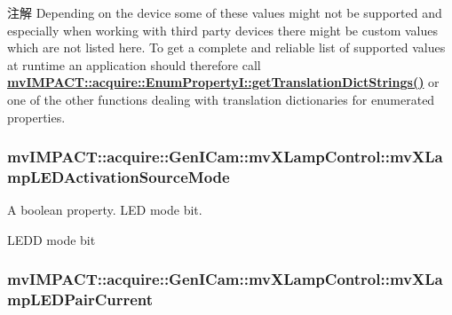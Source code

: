\begin{DoxyNote}{注解}
Depending on the device some of these values might not be supported and especially when working with third party devices there might be custom values which are not listed here. To get a complete and reliable list of supported values at runtime an application should therefore call {\bfseries \hyperlink{classmv_i_m_p_a_c_t_1_1acquire_1_1_enum_property_i_a0ba6ccbf5ee69784d5d0b537924d26b6}{mv\+I\+M\+P\+A\+C\+T\+::acquire\+::\+Enum\+Property\+I\+::get\+Translation\+Dict\+Strings()}} or one of the other functions dealing with translation dictionaries for enumerated properties. 
\end{DoxyNote}
\hypertarget{classmv_i_m_p_a_c_t_1_1acquire_1_1_gen_i_cam_1_1mv_x_lamp_control_adb271d278c08f414bcbf20ea53f72575}{
\subsubsection[{mv\+X\+Lamp\+L\+E\+D\+Activation\+Source\+Mode}]{ mv\+I\+M\+P\+A\+C\+T\+::acquire\+::\+Gen\+I\+Cam\+::mv\+X\+Lamp\+Control\+::mv\+X\+Lamp\+L\+E\+D\+Activation\+Source\+Mode}}\label{classmv_i_m_p_a_c_t_1_1acquire_1_1_gen_i_cam_1_1mv_x_lamp_control_adb271d278c08f414bcbf20ea53f72575}


A boolean property. L\+E\+D mode bit. 

L\+E\+D\+D mode bit \hypertarget{classmv_i_m_p_a_c_t_1_1acquire_1_1_gen_i_cam_1_1mv_x_lamp_control_a46b609a67ee31dee4d3eec62f45eecee}{
\subsubsection[{mv\+X\+Lamp\+L\+E\+D\+Pair\+Current}]{ mv\+I\+M\+P\+A\+C\+T\+::acquire\+::\+Gen\+I\+Cam\+::mv\+X\+Lamp\+Control\+::mv\+X\+Lamp\+L\+E\+D\+Pair\+Current}}\label{classmv_i_m_p_a_c_t_1_1acquire_1_1_gen_i_cam_1_1mv_x_lamp_control_a46b609a67ee31dee4d3eec62f45eecee}


